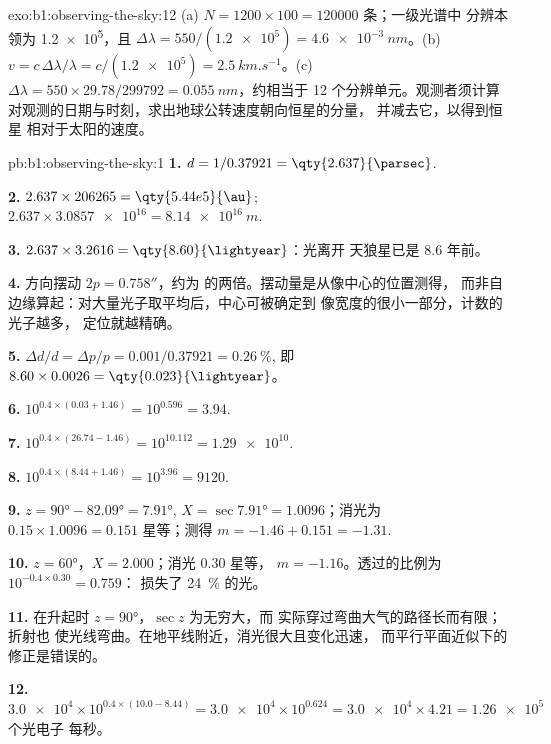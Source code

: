 \begin{solution}{exo:b1:observing-the-sky:12}
(a) $N = 1200\times100 = \num{120000}$ 条；一级光谱中
分辨本领为 \num{1.2e5}，且 $\Delta\lambda = 550/(\num{1.2e5}) =
\qty{4.6e-3}{nm}$。(b) $v = c\,\Delta\lambda/\lambda = c/(\num{1.2e5}) =
\qty{2.5}{km.s^{-1}}$。(c) $\Delta\lambda = 550\times29.78/\num{299792} =
\qty{0.055}{nm}$，约相当于 12 个分辨单元。观测者须计算
对观测的日期与时刻，求出地球公转速度朝向恒星的分量，
并减去它，以得到恒星
相对于太阳的速度。
\end{solution}

\begin{solution}{pb:b1:observing-the-sky:1}
\textbf{1.} $d = 1/0.37921 = \qty{2.637}{\parsec}$.

\textbf{2.} $2.637\times206265 = \qty{5.44e5}{\au}$;
$2.637\times\num{3.0857e16} = \qty{8.14e16}{m}$.

\textbf{3.} $2.637\times3.2616 = \qty{8.60}{\lightyear}$：光离开
天狼星已是 8.6 年前。

\textbf{4.} 方向摆动 $2p = \ang{;;0.758}$，约为
的两倍。摆动量是从像中心的位置测得，
而非自边缘算起：对大量光子取平均后，中心可被确定到
像宽度的很小一部分，计数的光子越多，
定位就越精确。

\textbf{5.} $\Delta d/d = \Delta p/p = 0.001/0.37921 = \qty{0.26}{\percent}$,
即 $8.60\times0.0026 = \qty{0.023}{\lightyear}$。

\textbf{6.} $10^{0.4\times(0.03 + 1.46)} = 10^{0.596} = 3.94$.

\textbf{7.} $10^{0.4\times(26.74 - 1.46)} = 10^{10.112} = \num{1.29e10}$.

\textbf{8.} $10^{0.4\times(8.44 + 1.46)} = 10^{3.96} = \num{9120}$.

\textbf{9.} $z = \ang{90} - \ang{82.09} = \ang{7.91}$, $X = \sec\ang{7.91} =
1.0096$；消光为 $0.15\times1.0096 = 0.151$ 星等；测得
$m = -1.46 + 0.151 = -1.31$.

\textbf{10.} $z = \ang{60}$，$X = 2.000$；消光 0.30 星等，
$m = -1.16$。透过的比例为 $10^{-0.4\times0.30} = 0.759$：
损失了 \qty{24}{\percent} 的光。

\textbf{11.} 在升起时 $z = \ang{90}$，$\sec z$ 为无穷大，而
实际穿过弯曲大气的路径长而有限；折射也
使光线弯曲。在地平线附近，消光很大且变化迅速，
而平行平面近似下的修正是错误的。

\textbf{12.} $\num{3.0e4}\times10^{0.4\times(10.0 - 8.44)} = \num{3.0e4}
\times10^{0.624} = \num{3.0e4}\times4.21 = \num{1.26e5}$ 个光电子
每秒。


\end{solution}
